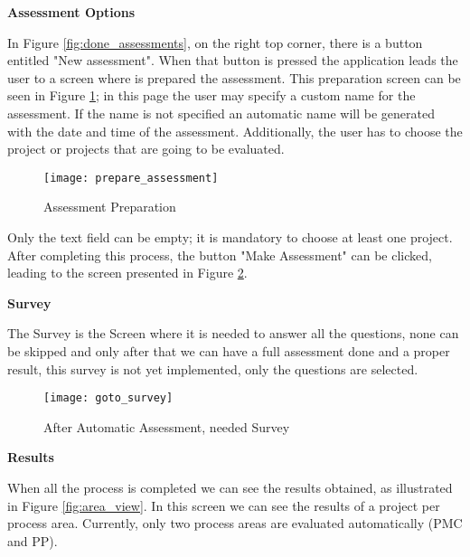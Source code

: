 \vspace{10 mm}

\textbf{Assessment Options}

In Figure \ref{fig:done_assessments}, on the right top corner, there is a button entitled "New assessment". When that button is pressed the application leads the user to a screen where is prepared the assessment. This preparation screen can be seen in Figure \ref{fig:prepare_assessment}; in this page the user may specify a custom name for the assessment. If the name is not specified an automatic name will be generated with the date and time of the assessment. Additionally, the user has to choose the project or projects that are going to be evaluated.

\begin{figure}[!htb]
	\begin{center}
		\leavevmode
		\texttt{[image: prepare\_assessment]}
		\caption{Assessment Preparation}
		\label{fig:prepare_assessment}
	\end{center}
\end{figure}

Only the text field can be empty; it is mandatory to choose at least one project. After completing this process, the button "Make Assessment" can be clicked, leading to the screen presented in Figure \ref{fig:goto_survey}.

\vspace{10 mm}
\newpage
\textbf{Survey}

The Survey is the Screen where it is needed to answer all the questions, none can be skipped and only after that we can have a full assessment done and a proper result, this survey is not yet implemented, only the questions are selected.

\begin{figure}[!htb]
	\begin{center}
		\leavevmode
		\texttt{[image: goto\_survey]}
		\caption{After Automatic Assessment, needed Survey}
		\label{fig:goto_survey}
	\end{center}
\end{figure}

\vspace{10 mm}

\newpage
\textbf{Results}

When all the process is completed we can see the results obtained, as illustrated in Figure \ref{fig:area_view}. In this screen we can see the results of a project per process area. Currently, only two process areas are evaluated automatically (PMC and PP).

